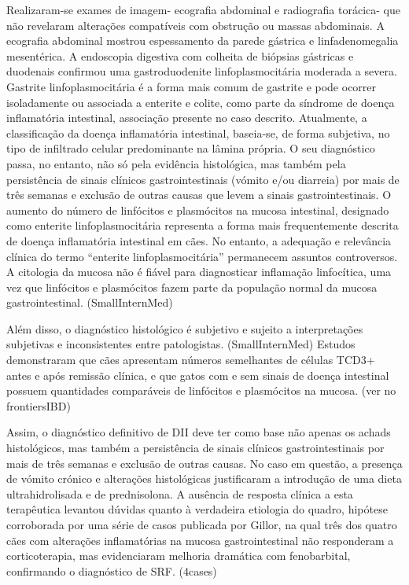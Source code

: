 Realizaram-se exames de imagem- ecografia abdominal e radiografia torácica- que não revelaram alterações compatíveis com obstrução ou massas abdominais. A ecografia abdominal mostrou espessamento da parede gástrica e linfadenomegalia mesentérica.  A endoscopia digestiva com colheita de biópsias gástricas e duodenais confirmou uma gastroduodenite linfoplasmocitária moderada a severa. Gastrite linfoplasmocitária é a forma mais comum de gastrite e pode ocorrer isoladamente ou associada a enterite e colite, como parte da síndrome de doença inflamatória intestinal, \cite{Amorim2016} associação presente no caso descrito. Atualmente, a classificação da doença inflamatória intestinal, baseia-se, de forma subjetiva, no tipo de infiltrado celular predominante na lâmina própria. O seu diagnóstico passa, no entanto, não só pela evidência histológica, mas também pela persistência de sinais clínicos gastrointestinais (vómito e/ou diarreia) por mais de três semanas e exclusão de outras causas que levem a sinais gastrointestinais. \cite{Jergens2012} O aumento do número de linfócitos e plasmócitos na mucosa intestinal, designado como enterite linfoplasmocitária representa a forma mais frequentemente descrita de doença inflamatória intestinal em cães. No entanto, a adequação e relevância clínica do termo “enterite linfoplasmocitária” permanecem assuntos controversos. A citologia da mucosa não é fiável para diagnosticar inflamação linfocítica, uma vez que linfócitos e plasmócitos fazem parte da população normal da mucosa gastrointestinal. (SmallInternMed) 

Além disso, o diagnóstico histológico é subjetivo e sujeito a interpretações subjetivas e inconsistentes entre patologistas. (SmallInternMed) Estudos demonstraram que cães apresentam números semelhantes de células TCD3+ antes e após remissão clínica, e que gatos com e sem sinais de doença intestinal possuem quantidades comparáveis de linfócitos e plasmócitos na mucosa. (ver no frontiersIBD) 


Assim, o diagnóstico definitivo de DII deve ter como base não apenas os achads histológicos, mas também a persistência de sinais clínicos gastrointestinais por mais de três semanas e exclusão de outras causas. No caso em questão, a presença de vómito crónico e alterações histológicas justificaram a introdução de uma dieta ultrahidrolisada e de prednisolona. A ausência de resposta clínica a esta terapêutica levantou dúvidas quanto à verdadeira etiologia do quadro, hipótese corroborada por uma série de casos publicada por Gillor, na qual três dos quatro cães com alterações inflamatórias na mucosa gastrointestinal não responderam a corticoterapia, mas evidenciaram melhoria dramática com fenobarbital, confirmando o diagnóstico de SRF. (4cases)



